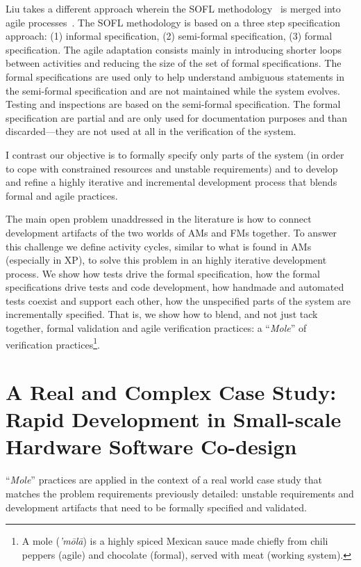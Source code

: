 \documentclass[english]{lni}
\newcommand{\mole}{``\emph{Mole}''\xspace}
\begin{document}
Liu takes a different approach wherein the SOFL methodology~\cite{Liu2004} is merged into agile processes~\cite{Liu2010}. 
The SOFL methodology is based on a three step specification approach: (1) informal specification, (2) semi-formal specification, (3) formal specification. 
The agile adaptation consists mainly in introducing shorter loops between activities and reducing the size of the set of formal specifications.
The formal specifications are used only to help understand ambiguous statements in the semi-formal specification and are not maintained while the system evolves.
Testing and inspections are based on the semi-formal specification.
The formal specification are partial and are only used for documentation purposes and than discarded---they are not used at all in the verification of the system.

I contrast our objective is to formally specify only parts of the system (in order to cope with constrained resources and unstable requirements) and to develop and refine a highly iterative and incremental development process that blends formal and agile practices.

The main open problem unaddressed in the literature is how to connect development artifacts of the two worlds of AMs and FMs together.
To answer this challenge we define activity cycles, similar to what is found in AMs (especially in XP), to solve this problem in an highly iterative development process.
We show how tests drive the formal specification, how the formal specifications drive tests and code development, how handmade and automated tests coexist and support each other, how the unspecified parts of the system are incrementally specified.
That is, we show how to blend, and not just tack together, formal validation and agile verification practices: a \mole of verification practices\footnote{A mole (\emph{'m\=ol\=a}) is a highly spiced Mexican sauce made chiefly from chili peppers (agile) and chocolate (formal), served with meat (working system).}.



\section{A Real and Complex Case Study: \\ Rapid Development in Small-scale Hardware Software Co-design}
\label{subsec:a_real_and_complex_case_study}

\mole practices are applied in the context of a real world case study that matches the problem requirements previously detailed: unstable requirements and development artifacts that need to be formally specified and validated.  
\end{document}
